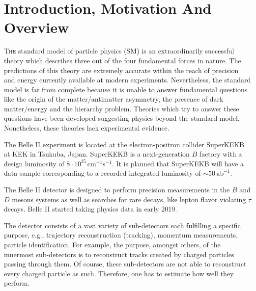 \documentclass[a4paper,11pt,twosided,final,german,openbib,pdftex,listof=totoc,bibliography=totoc]{scrbook}
\begin{document}
\renewcommand\contentsname{Contents}
\renewcommand\figurename{Figure}
\renewcommand\tablename{Table}
\tableofcontents
\clearpage

\mainmatter
\sloppy





\chapter{Introduction, Motivation And Overview}
\label{sec:Introduction}


\lettrine{T}{he} standard model of particle physics (SM) is an extraordinarily successful theory which describes three out of the four fundamental forces in nature. The predictions of this theory are extremely accurate within the reach of precision and energy currently available at modern experiments. 
Nevertheless, the standard model is far from complete because it is unable to answer fundamental questions like the origin of the matter/antimatter asymmetry, the presence of dark matter/energy and the hierarchy problem. Theories which try to answer these questions have been developed suggesting physics beyond the standard model. Nonetheless, these theories lack experimental evidence.
\newline

The Belle II experiment is located at the electron-positron collider SuperKEKB at KEK in Tsukuba, Japan. SuperKEKB is a next-generation $B$ factory with a design luminosity of $8\cdot 10^{35}\,\textrm{cm}^{-1}\textrm{s}^{-1}$. It is planned that SuperKEKB will have a data sample corresponding to a recorded integrated luminosity of $\sim 50\,\textrm{ab}^{-1}$. 

The Belle II detector is designed to perform precision measurements in the $B$ and $D$ mesons systems as well as searches for rare decays, like lepton flavor violating $\tau$ decays. 
Belle II started taking physics data in early 2019. 

The detector consists of a vast variety of sub-detectors each fulfilling a specific purpose, e.g., trajectory reconstruction (tracking), momentum measurements, particle identification. For example, the purpose, amongst others, of the innermost sub-detectors is to reconstruct tracks created by charged particles passing through them. Of course, these sub-detectors are not able to reconstruct every charged particle as such. Therefore, one has to estimate how well they perform.
\end{document}

